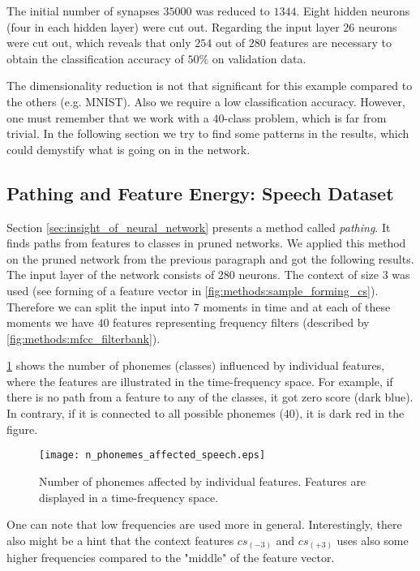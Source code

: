 The initial number of synapses $ 35000 $ was reduced to $ 1344 $. Eight hidden neurons (four in each hidden layer) were cut out. Regarding the input layer $ 26 $ neurons were cut out, which reveals that only $ 254 $ out of $ 280 $ features are necessary to obtain the classification accuracy of $ 50\% $ on validation data.

The dimensionality reduction is not that significant for this example compared to the others (e.g. MNIST). Also we require a low classification accuracy. However, one must remember that we work with a $ 40 $-class problem, which is far from trivial. In the following section we try to find some patterns in the results, which could demystify what is going on in the network.

\subsection*{Pathing and Feature Energy: Speech Dataset}
Section \ref{sec:insight_of_neural_network} presents a method called \textit{pathing}. It finds paths from features to classes in pruned networks. We applied this method on the pruned network from the previous paragraph and got the following results. The input layer of the network consists of $ 280 $ neurons. The context of size $ 3 $ was used (see forming of a feature vector in \cref{fig:methods:sample_forming_cs}). Therefore we can split the input into $ 7 $ moments in time and at each of these moments we have $ 40 $ features representing frequency filters (described by \cref{fig:methods:mfcc_filterbank}).

\cref{fig:examples:speech_n_phonemes_affected} shows the number of phonemes (classes) influenced by individual features, where the features are illustrated in the time-frequency space. For example, if there is no path from a feature to any of the classes, it got zero score (dark blue). In contrary, if it is connected to all possible phonemes ($ 40 $), it is dark red in the figure.

\begin{figure}[H]
\centering
\texttt{[image: n\_phonemes\_affected\_speech.eps]}
\caption{Number of phonemes affected by individual features. Features are displayed in a time-frequency space.}
\label{fig:examples:speech_n_phonemes_affected}
\end{figure}

One can note that low frequencies are used more in general. Interestingly, there also might be a hint that the context features $ cs_{(-3)} $ and $ cs_{(+3)} $ uses also some higher frequencies compared to the "middle" of the feature vector.

